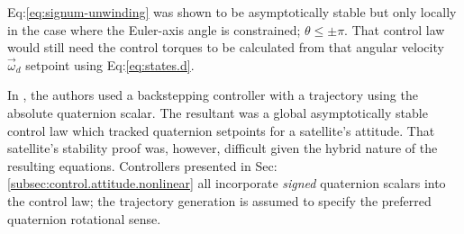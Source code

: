 Eq:\ref{eq:signum-unwinding} was shown to be asymptotically stable but only locally in the case where the Euler-axis angle is constrained; $\theta\leq \pm\pi$. That control law  would still need the control torques to be calculated from that angular velocity $\vec{\omega}_d$ setpoint using Eq:\ref{eq:states.d}.
\par
In \cite{intelligentbackstep}, the authors used a backstepping controller with a trajectory using the absolute quaternion scalar. The resultant was a global asymptotically stable control law which tracked quaternion setpoints for a satellite's attitude. That satellite's stability proof was, however, difficult given the hybrid nature of the resulting equations. Controllers presented in Sec:\ref{subsec:control.attitude.nonlinear} all incorporate \emph{signed} quaternion scalars into the control law; the trajectory generation is assumed to specify the preferred quaternion rotational sense.
\newpage
